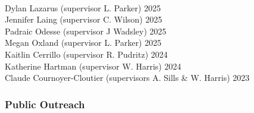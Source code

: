 \documentclass[12pt]{article}
\begin{document}
\\
Dylan Lazarus (supervisor L. Parker) 2025\\
Jennifer Laing (supervisor C. Wilson) 2025\\
Padraic Odesse (supervisor J Wadsley) 2025\\
Megan Oxland (supervisor L. Parker) 2025\\
Kaitlin Cerrillo (supervisor R. Pudritz) 2024\\
Katherine Hartman (supervisor W. Harris) 2024\\
Claude Cournoyer-Cloutier (supervisors A. Sills \& W. Harris) 2023\\



\subsubsection*{Public Outreach}
\end{document}
